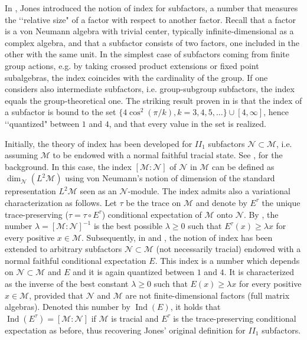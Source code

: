 \documentclass[11pt,a4paper]{article}
\makeatletter
\newcommand{\M}{\mathcal{M}}
\newcommand{\N}{\mathcal{N}}
\DeclareMathOperator{\Ind}{Ind}
\def\II{{I\!I}}%
\newcommand{\lqq}{\lq\lq}
\DeclareRobustCommand{\eg}{e.g.\@\xspace}
\DeclareRobustCommand{\ie}{i.e.\@\xspace}
\theoremstyle{plain}
\theoremstyle{definition}
\theoremstyle{remark}
\numberwithin{equation}{section}%
\makeatother
\begin{document}
In \cite{Jon83}, Jones introduced the notion of index for subfactors, a number that measures the \lqq relative size" of a factor with respect to another factor.
Recall that a factor is a von Neumann algebra with trivial center, typically infinite-dimensional as a complex algebra, and that a subfactor consists of two factors, one included in the other with the same unit. 
In the simplest case of subfactors coming from finite group actions, \eg by taking crossed product extensions or fixed point subalgebras, the index coincides with the cardinality of the group. If one considers also intermediate subfactors, \ie group-subgroup subfactors, the index equals the group-theoretical one. The striking result proven in \cite{Jon83} is that the index of a subfactor is bound to the set $\{4 \cos^2(\pi/k), k=3,4,5,\ldots\} \cup [4,\infty]$, hence \lqq quantized" between $1$ and $4$, and that every value in the set is realized.

Initially, the theory of index has been developed for $\II_1$ subfactors $\N\subset\M$, \ie assuming $\M$ to be endowed with a normal faithful tracial state. See \cite{JoSuBook}, \cite{EvKaBook} for the background. In this case, the index $[\M:\N]$ of $\N$ in $\M$ can be defined as $\dim_\N(L^2\M)$ using von Neumann's notion of dimension of the standard representation $L^2\M$ seen as an $\N$-module. The index admits also a variational characterization \cite{PiPo86} as follows. Let $\tau$ be the trace on $\M$ and denote by $E^\tau$ the unique trace-preserving ($\tau = \tau \circ E^\tau$) conditional expectation of $\M$ onto $\N$. By \cite{PiPo86}, the number $\lambda = [\M:\N]^{-1}$ is the best possible $\lambda\geq 0$ such that $E^\tau(x) \geq \lambda x$ for every positive $x\in\M$. Subsequently, in \cite{Kos86} and \cite{Lon89}, the notion of index has been extended to arbitrary subfactors $\N\subset\M$ (not necessarily tracial) endowed with a normal faithful conditional expectation $E$. This index is a number which depends on $\N\subset\M$ and $E$ and it is again quantized between $1$ and $4$. It is characterized as the inverse of the best constant $\lambda\geq 0$ such that $E(x) \geq \lambda x$ for every positive $x\in\M$, provided that $\N$ and $\M$ are not finite-dimensional factors (full matrix algebras). Denoted this number by $\Ind(E)$, it holds that $\Ind(E^\tau) = [\M:\N]$ if $\M$ is tracial and $E^\tau$ is the trace-preserving conditional expectation as before, thus recovering Jones' original definition for $\II_1$ subfactors. 
\end{document}
